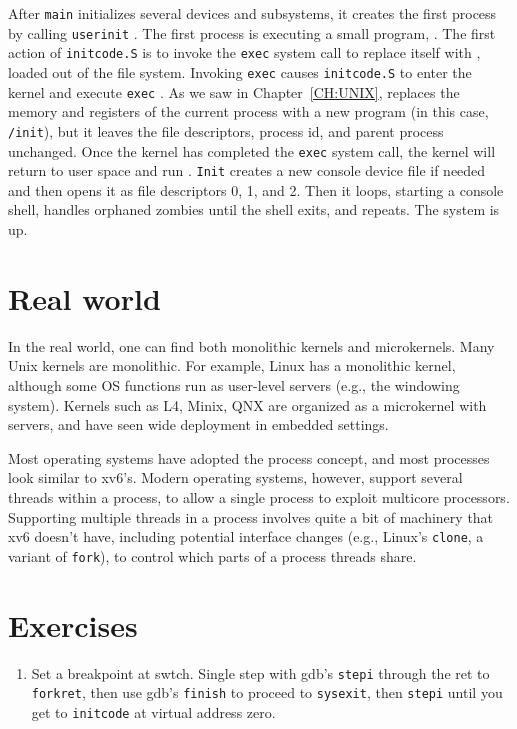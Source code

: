 After
\lstinline{main}
initializes several devices and subsystems, 
it creates the first process by calling 
\lstinline{userinit}
.
The first process is executing a small program,
.
The first action of 
\lstinline{initcode.S}
is to invoke  the
\lstinline{exec}
system call to replace itself with
,
loaded out of the file system.
Invoking
\lstinline{exec}
causes
\lstinline{initcode.S}
to enter the kernel and execute
\lstinline{exec}
.
As we saw in Chapter~\ref{CH:UNIX}, 
replaces the memory and registers of the
current process with a new program (in this case,
\lstinline{/init}),
but it leaves the
file descriptors, process id, and parent process unchanged.
Once the kernel has completed the
\lstinline{exec}
system call, the kernel will return to user space and run
.
\lstinline{Init}
creates a new console device file
if needed
and then opens it as file descriptors 0, 1, and 2.
Then it loops,
starting a console shell, 
handles orphaned zombies until the shell exits,
and repeats.
The system is up.
\section{Real world}

In the real world, one can find both monolithic kernels and microkernels. Many
Unix kernels are monolithic. For example, Linux has a monolithic kernel,
although some OS functions run as user-level servers (e.g., the windowing
system).  Kernels such as L4, Minix, QNX are organized as a microkernel with
servers, and have seen wide deployment in embedded settings.

Most operating systems have adopted the process concept, and most
processes look similar to xv6's.  Modern operating systems, however,
support several threads within a process, to allow a single process to
exploit multicore processors.  Supporting multiple threads in a
process involves quite a bit of machinery that xv6 doesn't have,
including potential interface changes (e.g., Linux's
\lstinline{clone},
a variant of
\lstinline{fork}),
to control which parts of
a process threads share.
\section{Exercises}

\begin{enumerate}
  
\item Set a breakpoint at swtch.  Single step with gdb's
\lstinline{stepi}
through the ret to
\lstinline{forkret},
then use gdb's
\lstinline{finish}
to proceed to
\lstinline{sysexit},
then
\lstinline{stepi}
until you get to
\lstinline{initcode} 
at virtual address zero.

\end{enumerate}
